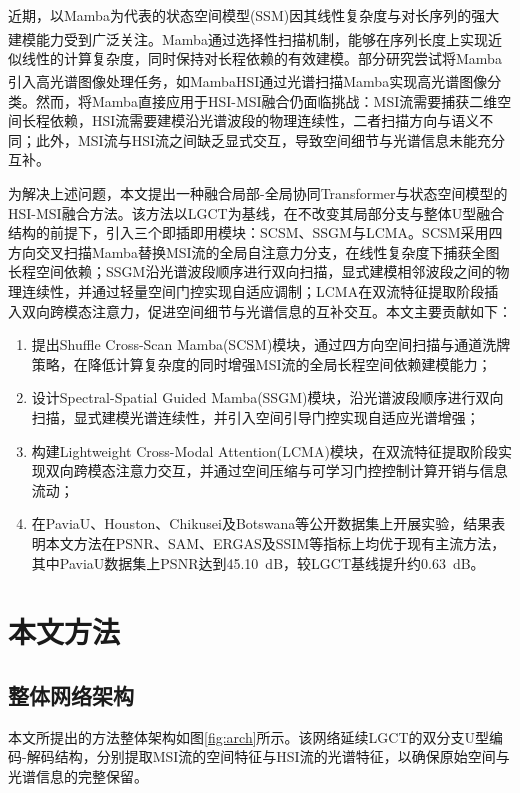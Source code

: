 \documentclass[UTF8,a4paper,11pt]{ctexart}
\newcommand{\upcite}[1]{\textsuperscript{\cite{#1}}}
\begin{document}
近期，以Mamba为代表的状态空间模型(SSM)因其线性复杂度与对长序列的强大建模能力受到广泛关注\upcite{ref14,ref15}。Mamba通过选择性扫描机制，能够在序列长度上实现近似线性的计算复杂度，同时保持对长程依赖的有效建模。部分研究尝试将Mamba引入高光谱图像处理任务，如MambaHSI\upcite{ref16}通过光谱扫描Mamba实现高光谱图像分类。然而，将Mamba直接应用于HSI-MSI融合仍面临挑战：MSI流需要捕获二维空间长程依赖，HSI流需要建模沿光谱波段的物理连续性，二者扫描方向与语义不同；此外，MSI流与HSI流之间缺乏显式交互，导致空间细节与光谱信息未能充分互补。

为解决上述问题，本文提出一种融合局部-全局协同Transformer与状态空间模型的HSI-MSI融合方法。该方法以LGCT为基线，在不改变其局部分支与整体U型融合结构的前提下，引入三个即插即用模块：SCSM、SSGM与LCMA。SCSM采用四方向交叉扫描Mamba替换MSI流的全局自注意力分支，在线性复杂度下捕获全图长程空间依赖；SSGM沿光谱波段顺序进行双向扫描，显式建模相邻波段之间的物理连续性，并通过轻量空间门控实现自适应调制；LCMA在双流特征提取阶段插入双向跨模态注意力，促进空间细节与光谱信息的互补交互。本文主要贡献如下：

\begin{enumerate}[label=\arabic*),leftmargin=2.2\ccwd,itemsep=2pt,topsep=2pt]
  \item 提出Shuffle Cross-Scan Mamba(SCSM)模块，通过四方向空间扫描与通道洗牌策略，在降低计算复杂度的同时增强MSI流的全局长程空间依赖建模能力；
  \item 设计Spectral-Spatial Guided Mamba(SSGM)模块，沿光谱波段顺序进行双向扫描，显式建模光谱连续性，并引入空间引导门控实现自适应光谱增强；
  \item 构建Lightweight Cross-Modal Attention(LCMA)模块，在双流特征提取阶段实现双向跨模态注意力交互，并通过空间压缩与可学习门控控制计算开销与信息流动；
  \item 在PaviaU、Houston、Chikusei及Botswana等公开数据集上开展实验，结果表明本文方法在PSNR、SAM、ERGAS及SSIM等指标上均优于现有主流方法，其中PaviaU数据集上PSNR达到45.10~dB，较LGCT基线提升约0.63~dB。
\end{enumerate}

\section{本文方法}
\subsection{整体网络架构}
本文所提出的方法整体架构如图\ref{fig:arch}所示。该网络延续LGCT的双分支U型编码-解码结构，分别提取MSI流的空间特征与HSI流的光谱特征，以确保原始空间与光谱信息的完整保留。
\end{document}
